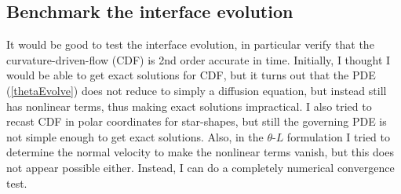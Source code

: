 \documentclass[11pt]{article}
\newcommand{\td}[2] { \frac{d #1} { d #2 } }
\newcommand{\grad}{\nabla}
\newcommand{\bvec}[1]{\ensuremath{\boldsymbol{#1}}}
\newcommand{\nhat}{\hat{\bvec{n}}}
\begin{document}
\begin{comment}
\subsubsection{The center of mass}
Consider the body's center of mass
\begin{equation}
(x_{cm}, y_{cm}) = \frac{1}{A} \iint (x, y) \, dA
\end{equation}
I did a calculation to determine the motion of the center of mass, given the interface velocity. The result that I get is
\begin{equation}
\td{}{t} (x_{cm}, y_{cm})  = -\frac{1}{A} \int (x(s), y(s)) V_n(s) \, ds
\end{equation}
I believe the sign is correct for $\nhat$ the inward pointing normal, so that $V_n$ is positive if the body is shrinking.
To calculate the center of mass, I can use the divergence theorem
\begin{equation}
\iint \grad \cdot \bvec{F} \, dA = \int \bvec{F} \cdot \nhat \, ds
\end{equation}
Take $\bvec{F} = \frac{1}{2} (x^2, y^2)$, so that $\grad \cdot \bvec{F} = (x,y)$. Then
\begin{equation}
(x_{cm}, y_{cm} ) = \frac{1}{2 A} \int x^2 n_x + y^2 n_y \, ds
\end{equation}
To calculate the total area, $A$, I can use the divergence theorem again, to get
\begin{equation}
A = \int x n_x ds = \int y n_y ds
\end{equation}
\end{comment}

\subsection{Benchmark the interface evolution}
It would be good to test the interface evolution, in particular verify that the curvature-driven-flow (CDF) is 2nd order accurate in time. Initially, I thought I would be able to get exact solutions for CDF, but it turns out that the PDE (\ref{thetaEvolve}) does not reduce to simply a diffusion equation, but instead still has nonlinear terms, thus making exact solutions impractical. I also tried to recast CDF in polar coordinates for star-shapes, but still the governing PDE is not simple enough to get exact solutions. Also, in the $\theta$-$L$ formulation I tried to determine the normal velocity to make the nonlinear terms vanish, but this does not appear possible either. Instead, I can do a completely numerical convergence test.
\end{document}
